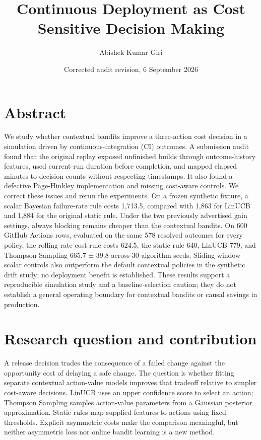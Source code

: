\documentclass[
  10pt,
]{article}
\title{Continuous Deployment as Cost Sensitive Decision Making}
\author{Abishek Kumar Giri}
\date{Corrected audit revision, 6 September 2026}
\begin{document}
\maketitle

\section{Abstract}\label{abstract}

We study whether contextual bandits improve a three-action cost decision
in a simulation driven by continuous-integration (CI) outcomes. A
submission audit found that the original replay exposed unfinished
builds through outcome-history features, used current-run duration
before completion, and mapped elapsed minutes to decision counts without
respecting timestamps. It also found a defective Page-Hinkley
implementation and missing cost-aware controls. We correct these issues
and rerun the experiments. On a frozen synthetic fixture, a scalar
Bayesian failure-rate rule costs 1,713.5, compared with 1,863 for LinUCB
and 1,884 for the original static rule. Under the two previously
advertised gain settings, always blocking remains cheaper than the
contextual bandits. On 600 GitHub Actions rows, evaluated on the same
578 resolved outcomes for every policy, the rolling-rate cost rule costs
624.5, the static rule 640, LinUCB 779, and Thompson Sampling 665.7 ±
39.8 across 30 algorithm seeds. Sliding-window scalar controls also
outperform the default contextual policies in the synthetic drift study;
no deployment benefit is established. These results support a
reproducible simulation study and a baseline-selection caution; they do
not establish a general operating boundary for contextual bandits or
causal savings in production.

\section{Research question and
contribution}\label{research-question-and-contribution}

A release decision trades the consequence of a failed change against the
opportunity cost of delaying a safe change. The question is whether
fitting separate contextual action-value models improves that tradeoff
relative to simpler cost-aware decisions. LinUCB uses an upper
confidence score to select an action; Thompson Sampling samples
action-value parameters from a Gaussian posterior approximation. Static
rules map supplied features to actions using fixed thresholds. Explicit
asymmetric costs make the comparison meaningful, but neither asymmetric
loss nor online bandit learning is a new method.
\end{document}
